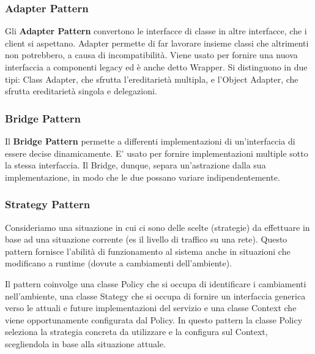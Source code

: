 \documentclass{article}
\begin{document}
        \subsubsection{Adapter Pattern}
                
            Gli \textbf{Adapter Pattern} convertono le interfacce di classe in altre interfacce, che i client si aspettano. Adapter permette di far lavorare insieme classi che altrimenti non potrebbero, a causa di incompatibilità. Viene usato per fornire una nuova interfaccia a componenti legacy ed è anche detto Wrapper. Si distinguono in due tipi: Class Adapter, che sfrutta l'ereditarietà multipla, e l'Object Adapter, che sfrutta ereditarietà singola e delegazioni.
                
        \subsubsection{Bridge Pattern}
                
            Il \textbf{Bridge Pattern} permette a differenti implementazioni di un'interfaccia di essere decise dinamicamente. E' usato per fornire implementazioni multiple sotto la stessa interfaccia. Il Bridge, dunque, separa un'astrazione dalla sua implementazione, in modo che le due possano variare indipendentemente.
                
        \subsubsection{Strategy Pattern}
        
            Consideriamo una situazione in cui ci sono delle scelte (strategie) da effettuare in base ad una situazione corrente (es il livello di traffico su una rete). Questo pattern fornisce l’abilità di funzionamento al sistema anche in situazioni che modificano a runtime (dovute a cambiamenti dell’ambiente).
            
            \vspace{6mm}
            
            Il pattern coinvolge una classe Policy che si occupa di identificare i cambiamenti nell’ambiente, una classe Stategy che si occupa di fornire un interfaccia generica verso le attuali e future implementazioni del servizio e una classe Context che viene opportunamente configurata dal Policy. In questo pattern la classe Policy seleziona la strategia concreta da utilizzare e la configura sul Context, scegliendola in base alla situazione attuale.
            
\end{document}
